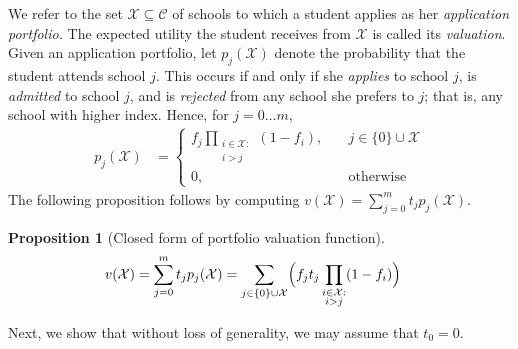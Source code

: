 \documentclass[11pt]{article} %
\newtheorem{proposition}{Proposition}
\theoremstyle{definition}
\begin{document}
We refer to the set $\mathcal{X} \subseteq \mathcal{C}$ of schools to which a student applies as her \emph{application portfolio.} The expected utility the student receives from $\mathcal{X}$ is called its \emph{valuation}. Given an application portfolio, let $p_j(\mathcal{X})$ denote the probability that the student attends school $j$. This occurs if and only if she \emph{applies} to school $j$, is \emph{admitted} to school $j$, and is \emph{rejected} from any school she prefers to $j$; that is, any school with higher index. Hence, for $j= 0\dots m$,
\begin{align}
p_j(\mathcal{X}) &= 
\begin{cases}
\displaystyle f_j  \prod_{\substack{i \in \mathcal{X}: \\ i > j}} (1 - f_{i}), \quad & j \in \{0\}\cup\mathcal{X}\\
0, \quad & \text{otherwise}
\end{cases} 
\end{align}
The following proposition follows by computing $v(\mathcal{X}) = \sum_{j=0}^m  t_j p_j(\mathcal{X})$.
\begin{proposition}[Closed form of portfolio valuation function]
\begin{align}
v(\mathcal{X}) &= \sum_{j=0}^m t_j p_j(\mathcal{X}) = \sum_{j\in\{0\}\cup\mathcal{X}} \Bigl( f_j t_j \prod_{\substack{i \in \mathcal{X}: \\ i > j}} (1 - f_{i}) \Bigr)  \label{closedformportfoliovaluationX}%
\end{align}
\end{proposition}

Next, we show that without loss of generality, we may assume that $t_0 = 0$.
\end{document}
